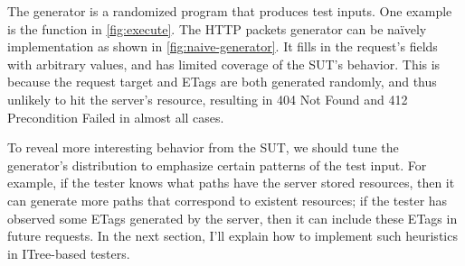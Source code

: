 The generator is a randomized program that produces test inputs.  One example is
the  function in \autoref{fig:execute}.  The HTTP packets
generator can be na\"ively implementation as shown in
\autoref{fig:naive-generator}.  It fills in the request's fields with arbitrary
values, and has limited coverage of the SUT's behavior.  This is because the
request target and ETags are both generated randomly, and thus unlikely to hit
the server's resource, resulting in 404 Not Found and 412 Precondition Failed in
almost all cases.

To reveal more interesting behavior from the SUT, we should tune the generator's
distribution to emphasize certain patterns of the test input.  For example, if
the tester knows what paths have the server stored resources, then it can
generate more paths that correspond to existent resources; if the tester has
observed some ETags generated by the server, then it can include these ETags in
future requests.  In the next section, I'll explain how to implement such
heuristics in ITree-based testers.

